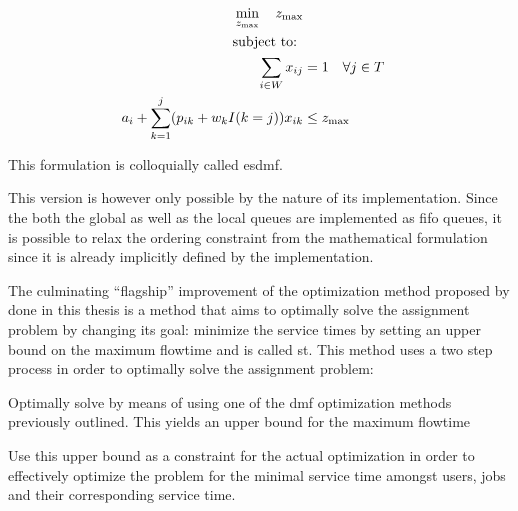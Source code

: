 \documentclass[draft=false]{seal_thesis}
\begin{document}
\begin{align}
    \min_{z_{\text{max}}} \quad z_{\text{max}}\\
    \text{subject to: } \notag \\
    \sum_{i \in W} x_{ij} &= 1 \quad \forall j \in T\\
    a_i + \sum_{k=1}^j (p_{ik} + w_k I(k=j))x_{ik} &\leq z_{\text{max}}
\end{align}

This formulation is colloquially called \gls{esdmf}.

This version is however only possible by the nature of its implementation. Since the both the global as well as the local queues are implemented as \gls{fifo} queues, it is possible to relax the ordering constraint from the mathematical formulation since it is already implicitly defined by the implementation.

The culminating ``flagship'' improvement of the optimization method proposed by \citet{Zeng2005} done in this thesis is a method that aims to optimally solve the assignment problem by changing its goal: minimize the service times by setting an upper bound on the maximum flowtime and is called \gls{st}. This method uses a two step process in order to optimally solve the assignment problem:
\begin{enumerate*}
	\item Optimally solve by means of using one of the \gls{dmf} optimization methods previously outlined. This yields an upper bound for the maximum flowtime
	\item Use this upper bound as a constraint for the actual optimization in order to effectively optimize the problem for the minimal service time amongst users, jobs and their corresponding service time.
\end{enumerate*}
\end{document}
